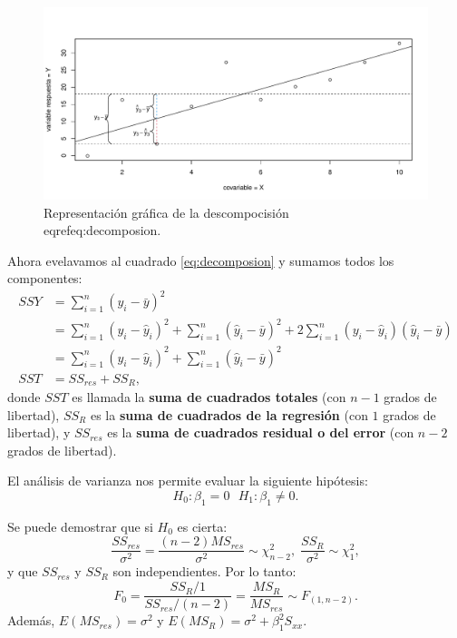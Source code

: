 \documentclass[
]{article}
\begin{document}
\begin{figure}

{\centering \includegraphics{MLG1_files/figure-latex/anovafig-1} 

}

\caption{Representación gráfica de la descompocisión \\eqref{eq:decomposion}.}\label{fig:anovafig}
\end{figure}

Ahora evelavamos al cuadrado \eqref{eq:decomposion} y sumamos todos los componentes:
\begin{equation}
\begin{split}
SSY &= \sum_{i=1}^{n} (y_{i} - \bar{y})^{2} \\
&= \sum_{i=1}^{n} (y_{i} - \widehat{y}_{i})^{2} + \sum_{i=1}^{n}(\widehat{y}_{i} - \bar{y})^{2} + 2 \sum_{i=1}^{n}(y_{i} - \widehat{y}_{i})(\widehat{y}_{i} - \bar{y}) \\
&= \sum_{i=1}^{n} (y_{i} - \widehat{y}_{i})^{2} + \sum_{i=1}^{n}(\widehat{y}_{i} - \bar{y})^{2} \\
SST &=  SS_{res} + SS_{R},
\end{split}
\label{eq:ss}
\end{equation}
donde \(SST\) es llamada la \textbf{suma de cuadrados totales} (con \(n-1\) grados de libertad), \(SS_{R}\) es la \textbf{suma de cuadrados de la regresión} (con \(1\) grados de libertad), y \(SS_{res}\) es la \textbf{suma de cuadrados residual o del error} (con \(n-2\) grados de libertad).

El análisis de varianza nos permite evaluar la siguiente hipótesis:
\begin{equation}
H_{0}: \beta_{1} = 0 \mbox{  }H_{1}:  \beta_{1} \neq 0.
\label{eq:anova}
\end{equation}

Se puede demostrar que si \(H_{0}\) es cierta:
\[
\frac{SS_{res}}{\sigma^{2}} = \frac{(n-2)MS_{res}}{\sigma^{2}} \sim \chi^{2}_{n-2} \mbox{,} \ \  \frac{SS_{R}}{\sigma^{2}} \sim \chi^{2}_{1},
\]
y que \(SS_{res}\) y \(SS_{R}\) son independientes. Por lo tanto:
\[
F_{0} = \frac{SS_{R}/1}{SS_{res}/(n-2)} = \frac{MS_{R}}{MS_{res}} \sim F_{(1,n-2)}.
\]
Además, \(E(MS_{res})=\sigma^{2}\) y \(E(MS_{R})=\sigma^{2} + \beta_{1}^{2}S_{xx}\).
\end{document}

